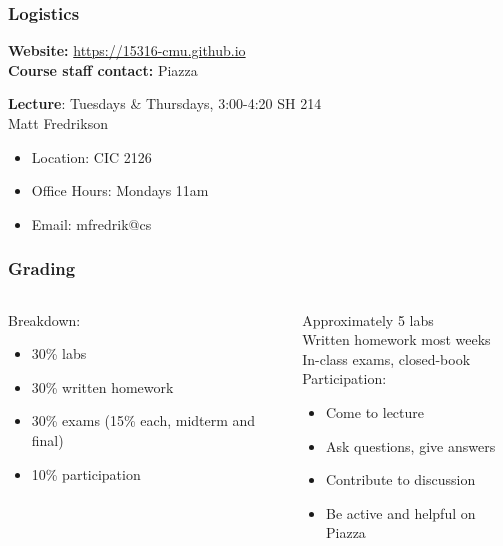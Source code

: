 \documentclass[10pt,handout]{beamer}
\begin{document}
\begin{frame}

\frametitle{Logistics}

\textbf{Website:} \url{https://15316-cmu.github.io}
\\[1em]

\textbf{Course staff contact:} Piazza

\textbf{Lecture}: Tuesdays \& Thursdays, 3:00-4:20 SH 214
\\[1em]

Matt Fredrikson
\begin{itemize}
\item Location: CIC 2126
\item Office Hours: Mondays 11am
\item Email: mfredrik@cs
\end{itemize}

\end{frame}


\begin{frame}

\frametitle{Grading}

\begin{columns}
\begin{column}{0.45\textwidth}
Breakdown:
\begin{itemize}
\item 30\% labs
\item 30\% written homework
\item 30\% exams (15\% each, midterm and final)
\item 10\% participation
\end{itemize}
\end{column}

\begin{column}{0.55\textwidth}
Approximately 5 labs
\\[1em]

Written homework most weeks
\\[1em]

In-class exams, closed-book
\\[1em]

Participation:
\begin{itemize}
\item Come to lecture
\item Ask questions, give answers
\item Contribute to discussion
\item Be active and helpful on Piazza
\end{itemize}
\end{column}
\end{columns}

\end{frame}
\end{document}
